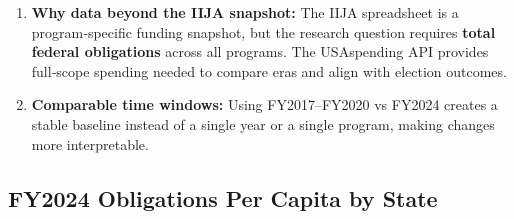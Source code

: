 \documentclass[
  11pt,
]{article}
\begin{document}
\begin{enumerate}
\def\labelenumi{\arabic{enumi}.}
\item
  \textbf{Why data beyond the IIJA snapshot:} The IIJA spreadsheet is a
  program‑specific funding snapshot, but the research question requires
  \textbf{total federal obligations} across all programs. The
  USAspending API provides full‑scope spending needed to compare eras
  and align with election outcomes.
\item
  \textbf{Comparable time windows:} Using FY2017--FY2020 vs FY2024
  creates a stable baseline instead of a single year or a single
  program, making changes more interpretable.
\end{enumerate}

\subsection{FY2024 Obligations Per Capita by
State}\label{fy2024-obligations-per-capita-by-state}
\end{document}
